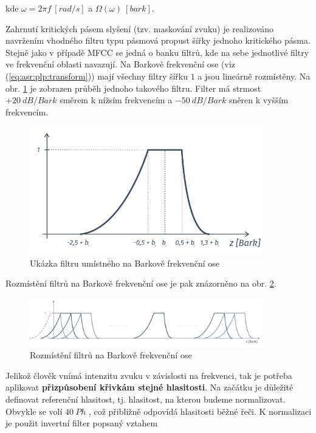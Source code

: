 \noindent kde $\omega = 2\pi f\ \left[rad/s\right]$ a $\Omega\left(\omega\right)\ \left[bark\right]$.

Zahrnutí kritických pásem slyšení (tzv. maskování zvuku) je realizováno navržením vhodného filtru typu pásmová propust šířky jednoho kritického pásma. Stejně jako v případě MFCC se jedná o banku filtrů, kde na sebe jednotlivé filtry ve frekvenční oblasti navazují. Na Barkově frekvenční ose (viz (\ref{eq:asr:plp:transform})) mají všechny filtry šířku $1$ a jsou lineárně rozmístěny. Na obr. \ref{fig:asr:plp:filter} je zobrazen průběh jednoho takového filtru. Filter má strmost $+20\ dB/Bark$ směrem k nížsím frekvencím a $-50\ dB/Bark$ sněren k vyšším frekvencím.

\begin{figure}[hbpt]
  \centering
  \includegraphics[width=0.9\textwidth]{./ch4-asr/img/plp_filter.pdf}
  \caption{Ukázka filtru umístného na Barkově frekvenční ose}
  \label{fig:asr:plp:filter}
\end{figure}

Rozmístění filtrů na Barkově frekvenční ose je pak znázorněno na obr. \ref{fig:asr:plp:bank}.

\begin{figure}[hbpt]
  \centering
  \includegraphics[width=0.9\textwidth]{./ch4-asr/img/plp-bank.pdf}
  \caption{Rozmístění filtrů na Barkově frekvenční ose}
  \label{fig:asr:plp:bank}
\end{figure}

Jelikož člověk vnímá intenzitu zvuku v závislosti na frekvenci, tak je potřeba aplikovat \textbf{přizpůsobení křivkám stejné hlasitosti}. Na začátku je důležité definovat referenční hlasitost, tj. hlasitost, na kterou budeme normalizovat. Obvykle se volí $40\ Ph$ \cite{Psutka2006}, což přibližně odpovídá hlasitosti běžné řeči. K normalizaci je použit invertní filter popsaný vztahem

